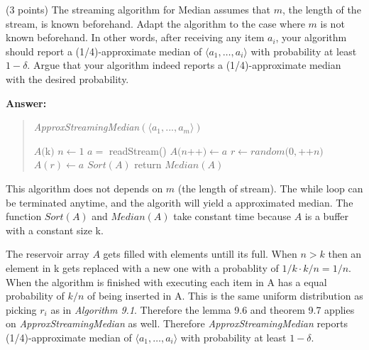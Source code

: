 \documentclass{article}
\newcommand{\median}{{\sc Median}\xspace}
\newcounter{rcounter}
\newenvironment{rlist}%
{\begin{list}{\setnr-\arabic{rcounter}}{\usecounter{rcounter}}}{\end{list}}
\begin{document}
\begin{rlist}
        \item (3 points)
        The streaming algorithm for \median assumes that $m$, the length of the stream, is known beforehand. Adapt the algorithm to the case where $m$ is not known beforehand. In other words, after receiving any item $a_i$, your algorithm should report a (1/4)-approximate median of $\langle a_1,\ldots,a_i\rangle$ with probability at least $1-\delta$. Argue that your algorithm indeed reports a (1/4)-approximate median with the desired probability.
        
        \textbf{Answer:}
        
        \begin{algorithm}
            \vspace*{2mm}
            \begin{quotation}
                \noindent
                \emph{ApproxStreamingMedian}$(\langle a_1,...,a_m \rangle)$ \\[-5mm]
                \begin{algorithmic}[1]
                    \State $A($k$)$
                    \State $n \leftarrow 1$
                    \State $a = $ readStream() 
                    \State $A(n$++$) \leftarrow a$
                    \Else
                    \State $r \leftarrow random(0,$++$n)$
                    \State $A(r) \leftarrow a$
                    \EndIf
                    \EndIf
                    \EndWhile
                    \State $Sort(A)$
                    \State return $Median(A)$
                \end{algorithmic}
            \end{quotation}
        \end{algorithm}
        
        This algorithm does not depends on $m$ (the length of stream). The while loop can be terminated anytime, and the algorith will yield a approximated median. The function $Sort(A)$ and $Median(A)$ take constant time because $A$ is a buffer with a constant size k.
        
        The reservoir array $A$ gets filled with elements untill its full. When $n>k$ then an element in k gets replaced with a new one with a probablity of $1/k \cdot k/n = 1/n$. When the algorithm is finished with executing each item in A has a equal probability of $k/n$ of being inserted in A. This is the same uniform distribution as picking $r_i$ as in \emph{Algorithm 9.1}. Therefore the lemma 9.6 and theorem 9.7 applies on \emph{ApproxStreamingMedian} as well. Therefore \emph{ApproxStreamingMedian} reports (1/4)-approximate median of $\langle a_1,\ldots,a_i\rangle$ with probability at least $1-\delta$.
        

\end{rlist}
\end{document}
